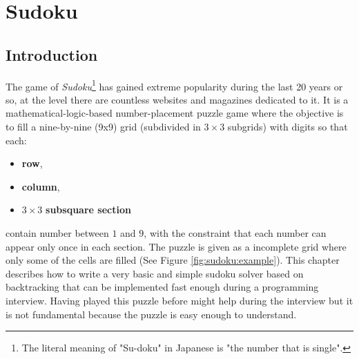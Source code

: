 %

\chapter{Sudoku}
\label{ch:sudoku}
\section*{Introduction}
The game of \textit{Sudoku}\footnote{The literal meaning of "Su-doku" in Japanese is "the number
that is single".} has gained extreme popularity during the last 20 years or so, at the level there
are countless websites and magazines dedicated to it. It is a mathematical-logic-based
number-placement puzzle game where the objective is to fill a nine-by-nine (9x9) grid (subdivided in
$3\times3$ subgrids) with digits so that each:
\begin{itemize}[a)]
	\item \textbf{row},
	\item \textbf{column},
	\item $3\times3$ \textbf{subsquare section}
\end{itemize}
contain number between $1$ and $9$, with the constraint that each number can appear only once in
each section. The puzzle is given as a incomplete grid where only some of the cells are filled (See
Figure \ref{fig:sudoku:example}). This chapter describes how to write a very basic and simple sudoku
solver based on backtracking that can be implemented fast enough during a programming interview.
Having played this puzzle before might help during the interview but it is not fundamental because
the puzzle is easy enough to understand.

